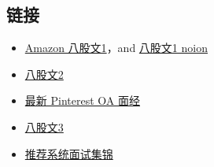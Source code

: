 \documentclass[12pt]{article}
\numberwithin{theorem}{section} %
\numberwithin{definition}{section} %
\numberwithin{assumption}{section} %
\numberwithin{lemma}{section} %
\numberwithin{remark}{section} %
\numberwithin{prop}{section} %
\numberwithin{corollary}{section} %
\numberwithin{example}{section} %
\numberwithin{question}{section} %
\numberwithin{problem}{section} %
\numberwithin{conjecture}{section} %
\numberwithin{append}{section} %
\numberwithin{property}{section} %
\begin{document}
\begin{CJK}{UTF8}{gbsn}
\section{链接}
\begin{itemize}
	\item \href{https://www.1point3acres.com/bbs/thread-713903-1-1.html}{Amazon 八股文1}，and  \href{https://northern-dracopelta-98c.notion.site/5b22e124e16d4b2d937940367ca20eb0?v=19feabb85e9e4b54bc498579b3c7f1c5&p=e74be76a2d3c4746b94e54d190100e4e&pm=s}{八股文1 noion}
	\item \href{https://www.1point3acres.com/bbs/thread-714090-1-1.html}{八股文2}
	\item \href{https://www.1point3acres.com/bbs/thread-927931-1-1.html}{最新 Pinterest OA 面经}
	\item \href{https://www.1point3acres.com/bbs/thread-714558-1-1.html}{八股文3}
	\item\href{https://zhuanlan.zhihu.com/p/422464069}{推荐系统面试集锦}
\end{itemize}





	 \end{CJK}  
\end{document}
